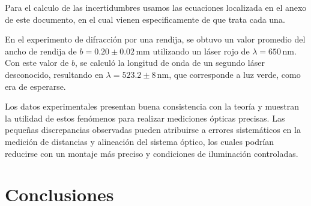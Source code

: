 \documentclass[article,12pt]{elsarticle}
\begin{document}
\begin{table}[H]
\centering
{}
\caption{Deducción de la longitud de onda \( \lambda \) usando el patrón de interferencia.}
\end{table}
Para el calculo de las incertidumbres usamos las ecuaciones localizada en el anexo de este documento, en el cual vienen especificamente de que trata cada una.

En el experimento de difracción por una rendija, se obtuvo un valor promedio del ancho de rendija de $b = 0.20 \pm 0.02\, \text{mm}$ utilizando un láser rojo de $\lambda = 650\, \text{nm}$. Con este valor de $b$, se calculó la longitud de onda de un segundo láser desconocido, resultando en $\lambda = 523.2 \pm 8\, \text{nm}$, que corresponde a luz verde, como era de esperarse.

Los datos experimentales presentan buena consistencia con la teoría y muestran la utilidad de estos fenómenos para realizar mediciones ópticas precisas. Las pequeñas discrepancias observadas pueden atribuirse a errores sistemáticos en la medición de distancias y alineación del sistema óptico, los cuales podrían reducirse con un montaje más preciso y condiciones de iluminación controladas.


\section{Conclusiones}
\end{document}
